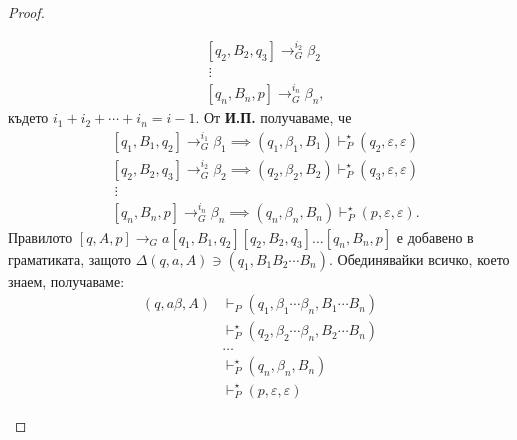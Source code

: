 \begin{proof}
\begin{enumerate}[1)]
\begin{description}
\begin{align*}
        & [q_2,B_2,q_{3}] \to^{i_2}_G \beta_2\\
        & \ \vdots\\
        & [q_{n},B_n, p] \rightarrow^{i_n}_G \beta_n,
      \end{align*}
      където $i_1 + i_2 + \cdots + i_n = i-1$.
      От {\bf И.П.} получаваме, че 
      \begin{align*}
        & [q_1,B_1,q_{2}] \to^{i_1}_G \beta_1 \implies (q_1,\beta_1,B_1) \vdash^\star_P (q_{2},\varepsilon,\varepsilon) \\
        & [q_2,B_2,q_{3}] \to^{i_2}_G \beta_2 \implies (q_2,\beta_2,B_2) \vdash^\star_P (q_{3},\varepsilon,\varepsilon)\\
        & \ \vdots\\
        & [q_{n},B_n, p] \rightarrow^{i_n}_G \beta_n \implies  (q_{n},\beta_n,B_n) \vdash^\star_P (p,\varepsilon,\varepsilon).
      \end{align*}
      Правилото $[q,A,p] \rightarrow_G a[q_1,B_1,q_2][q_2,B_2,q_3]\dots[q_n,B_n,p]$ е добавено в граматиката, 
      защото $\Delta(q,a,A) \ni (q_1, B_1B_2\cdots B_n)$. 
      Обединявайки всичко, което знаем, получаваме:
      \begin{align*}
        (q, a\beta, A) & \vdash_P (q_1, \beta_1\cdots\beta_n, B_1\cdots B_n)\\
        & \vdash^\star_P (q_2, \beta_{2}\cdots\beta_n, B_2\cdots B_n)\\
        & \dots\\
        & \vdash^\star_P (q_n, \beta_n, B_n)\\
        & \vdash^\star_P (p, \varepsilon, \varepsilon)
      \end{align*}
    \end{description}
  \end{enumerate}
\end{proof}


